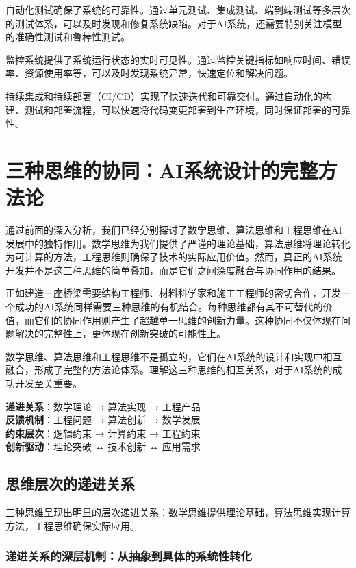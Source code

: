 自动化测试确保了系统的可靠性。通过单元测试、集成测试、端到端测试等多层次的测试体系，可以及时发现和修复系统缺陷。对于AI系统，还需要特别关注模型的准确性测试和鲁棒性测试。

监控系统提供了系统运行状态的实时可见性。通过监控关键指标如响应时间、错误率、资源使用率等，可以及时发现系统异常，快速定位和解决问题。

持续集成和持续部署（CI/CD）实现了快速迭代和可靠交付。通过自动化的构建、测试和部署流程，可以快速将代码变更部署到生产环境，同时保证部署的可靠性。

\section{三种思维的协同：AI系统设计的完整方法论}

通过前面的深入分析，我们已经分别探讨了数学思维、算法思维和工程思维在AI发展中的独特作用。数学思维为我们提供了严谨的理论基础，算法思维将理论转化为可计算的方法，工程思维则确保了技术的实际应用价值。然而，真正的AI系统开发并不是这三种思维的简单叠加，而是它们之间深度融合与协同作用的结果。

正如建造一座桥梁需要结构工程师、材料科学家和施工工程师的密切合作，开发一个成功的AI系统同样需要三种思维的有机结合。每种思维都有其不可替代的价值，而它们的协同作用则产生了超越单一思维的创新力量。这种协同不仅体现在问题解决的完整性上，更体现在创新突破的可能性上。

数学思维、算法思维和工程思维不是孤立的，它们在AI系统的设计和实现中相互融合，形成了完整的方法论体系。理解这三种思维的相互关系，对于AI系统的成功开发至关重要。

\begin{tcolorbox}[colback=red!5!white,colframe=red!75!black,title=协同关系：三种思维的融合模式]
\textbf{递进关系}：数学理论 → 算法实现 → 工程产品\\
\textbf{反馈机制}：工程问题 → 算法创新 → 数学发展\\
\textbf{约束层次}：逻辑约束 → 计算约束 → 工程约束\\
\textbf{创新驱动}：理论突破 ↔ 技术创新 ↔ 应用需求
\end{tcolorbox}

\subsection{思维层次的递进关系}

三种思维呈现出明显的层次递进关系：数学思维提供理论基础，算法思维实现计算方法，工程思维确保实际应用。

\subsubsection{递进关系的深层机制：从抽象到具体的系统性转化}

